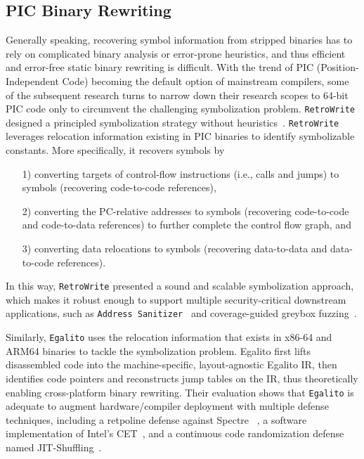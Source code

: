 \subsection{PIC Binary Rewriting} \label{sec:existing-pic}
Generally speaking, recovering symbol information from stripped binaries has to rely on complicated binary analysis or error-prone heuristics, and thus efficient and error-free static binary rewriting is difficult. With the trend of PIC (Position-Independent Code) becoming the default option of mainstream compilers, some of the subsequent research turns to narrow down their research scopes to 64-bit PIC code only to circumvent the challenging symbolization problem.
\texttt{RetroWrite} designed a principled symbolization strategy without heuristics~\cite{dinesh2020retrowrite}. \texttt{RetroWrite} leverages relocation information existing in PIC binaries to identify symbolizable constants. More specifically, it recovers symbols by
\begin{itemize}
  \item[1)] converting targets of control-flow instructions (i.e., calls and jumps) to symbols (recovering code-to-code references),
  \item[2)] converting the PC-relative addresses to symbols (recovering code-to-code and code-to-data references) to further complete the control flow graph, and
  \item[3)] converting data relocations to symbols (recovering data-to-data and data-to-code references).
\end{itemize}

In this way, \texttt{RetroWrite} presented a sound and scalable symbolization approach, which makes it robust enough to support multiple security-critical downstream applications, such as \texttt{Address Sanitizer}~\cite{serebryany2012addresssanitizer} and coverage-guided greybox fuzzing~\cite{zalewski2014american}.

Similarly, \texttt{Egalito} uses the relocation information that exists in x86-64 and ARM64 binaries to tackle the symbolization problem. Egalito first lifts disassembled code into the machine-specific, layout-agnostic Egalito IR, then identifies code pointers and reconstructs jump tables on the IR, thus theoretically enabling cross-platform binary rewriting. Their evaluation shows that \texttt{Egalito} is adequate to augment hardware/compiler deployment with multiple defense techniques, including a retpoline defense against Spectre ~\cite{kocher2019spectre}, a software implementation of Intel’s CET~\cite{cet}, and a continuous code randomization defense named JIT-Shuffling~\cite{williams2016shuffler}.

